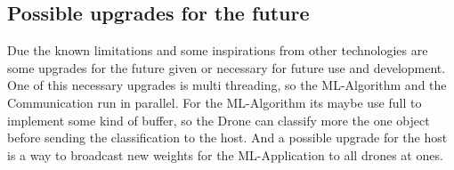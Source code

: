 \subsection*{Possible upgrades for the future}
Due the known limitations and some inspirations from other technologies are some upgrades for the future given or necessary for future use and development.
One of this necessary upgrades is multi threading, so the ML-Algorithm and the Communication run in parallel.
For the ML-Algorithm its maybe use full to implement some kind of buffer, so the Drone can classify more the one object before sending the classification to the host.
And a possible upgrade for the host is a way to broadcast new weights for the ML-Application to all drones at ones.

\newpage

\printbibliography

